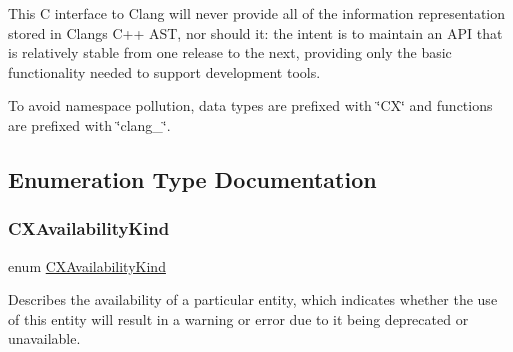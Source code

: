 This C interface to Clang will never provide all of the information representation stored in Clang\textquotesingle{}s C++ A\+ST, nor should it\+: the intent is to maintain an A\+PI that is relatively stable from one release to the next, providing only the basic functionality needed to support development tools.

To avoid namespace pollution, data types are prefixed with \char`\"{}\+C\+X\char`\"{} and functions are prefixed with \char`\"{}clang\+\_\+\char`\"{}. 

\subsection{Enumeration Type Documentation}
\mbox{\label{group__CINDEX_gada331ea0195e952c8f181ecf15e83d71}} 
\subsubsection{\texorpdfstring{C\+X\+Availability\+Kind}{CXAvailabilityKind}}
{\footnotesize\ttfamily enum \hyperlink{group__CINDEX_gada331ea0195e952c8f181ecf15e83d71}{C\+X\+Availability\+Kind}}



Describes the availability of a particular entity, which indicates whether the use of this entity will result in a warning or error due to it being deprecated or unavailable. 

